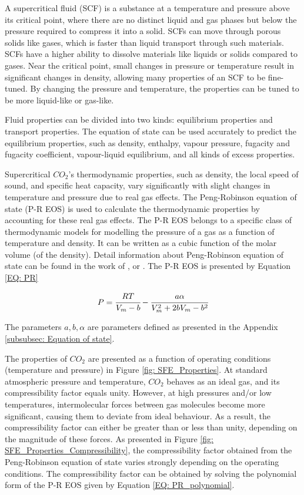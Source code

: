 \documentclass[../Article_Model_Parameters.tex]{subfiles}
\begin{document}
	
	A supercritical fluid (SCF) is a substance at a temperature and pressure above its critical point, where there are no distinct liquid and gas phases but below the pressure required to compress it into a solid. SCFs can move through porous solids like gases, which is faster than liquid transport through such materials. SCFs have a higher ability to dissolve materials like liquids or solids compared to gases. Near the critical point, small changes in pressure or temperature result in significant changes in density, allowing many properties of an SCF to be fine-tuned. By changing the pressure and temperature, the properties can be tuned to be more liquid-like or gas-like.
	
	Fluid properties can be divided into two kinds: equilibrium properties and transport properties. The equation of state can be used accurately to predict the equilibrium properties, such as density, enthalpy, vapour pressure, fugacity and fugacity coefficient, vapour-liquid equilibrium, and all kinds of excess properties.
	
	Supercritical $CO_2$'s thermodynamic properties, such as density, the local speed of sound, and specific heat capacity, vary significantly with slight changes in temperature and pressure due to real gas effects. The Peng-Robinson equation of state (P-R EOS) is used to calculate the thermodynamic properties by accounting for these real gas effects. The P-R EOS belongs to a specific class of thermodynamic models for modelling the pressure of a gas as a function of temperature and density. It can be written as a cubic function of the molar volume (of the density). Detail information about Peng-Robinson equation of state can be found in the work of \citet{Peng1976}, \citet{Elliott2011} or \citet{Pratt2001}. The P-R EOS is presented by Equation \ref{EQ: PR}
	
	{\footnotesize
		\begin{equation}
			P = \cfrac{RT}{V_m - b} - \cfrac{a\alpha}{V_m^2 + 2bV_m - b^2}
			\label{EQ: PR}
		\end{equation}
	}
	
	The parameters $a, b, \alpha$ are parameters defined as presented in the Appendix \ref{subsubsec: Equation of state}.
	
	The properties of $CO_2$  are presented as a function of operating conditions (temperature and pressure) in Figure \ref{fig: SFE_Properties}. At standard atmospheric pressure and temperature, $CO_2$  behaves as an ideal gas, and its compressibility factor equals unity. However, at high pressures and/or low temperatures, intermolecular forces between gas molecules become more significant, causing them to deviate from ideal behaviour. As a result, the compressibility factor can either be greater than or less than unity, depending on the magnitude of these forces. As presented in Figure \ref{fig: SFE_Properties_Compressibility}, the compressibility factor obtained from the Peng-Robinson equation of state varies strongly depending on the operating conditions. The compressibility factor can be obtained by solving the polynomial form of the P-R EOS given by Equation \ref{EQ: PR_polynomial}.
	
\end{document}
